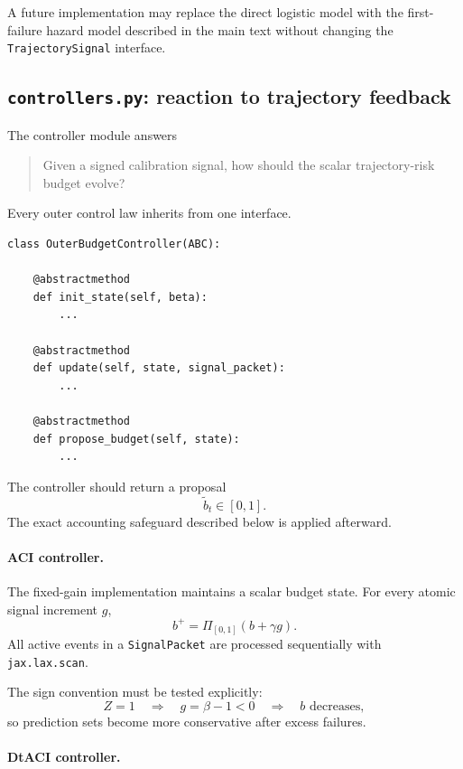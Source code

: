 \documentclass[11pt]{article}
\begin{document}
A future implementation may replace the direct logistic model with the
first-failure hazard model described in the main text without changing the
\texttt{TrajectorySignal} interface.

\subsection{\texttt{controllers.py}: reaction to trajectory feedback}
\label{app:controllers-module}

The controller module answers

\begin{quote}
Given a signed calibration signal, how should the scalar trajectory-risk
budget evolve?
\end{quote}

Every outer control law inherits from one interface.

\begin{verbatim}
class OuterBudgetController(ABC):

    @abstractmethod
    def init_state(self, beta):
        ...

    @abstractmethod
    def update(self, state, signal_packet):
        ...

    @abstractmethod
    def propose_budget(self, state):
        ...
\end{verbatim}

The controller should return a proposal
\[
    \widetilde b_t\in[0,1].
\]
The exact accounting safeguard described below is applied afterward.

\paragraph{ACI controller.}

The fixed-gain implementation maintains a scalar budget state.  For every
atomic signal increment $g$,
\[
\boxed{
    b^+
    =
    \Pi_{[0,1]}
    \left(
        b+\gamma g
    \right).
}
\]
All active events in a \texttt{SignalPacket} are processed sequentially with
\texttt{jax.lax.scan}.

The sign convention must be tested explicitly:
\[
    Z=1
    \quad\Rightarrow\quad
    g=\beta-1<0
    \quad\Rightarrow\quad
    b\text{ decreases},
\]
so prediction sets become more conservative after excess failures.

\paragraph{DtACI controller.}
\end{document}
